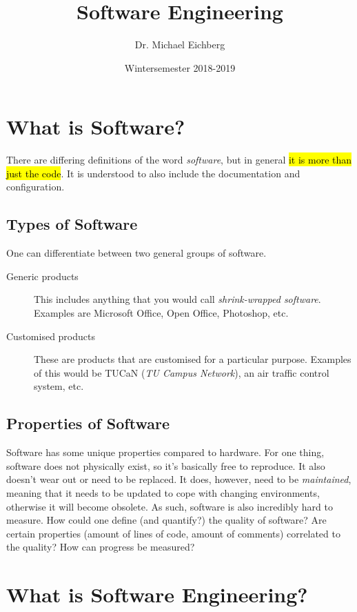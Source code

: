 \documentclass[english]{scrartcl}
\title{Software Engineering}
\date{Wintersemester 2018-2019}
\author{Dr. Michael Eichberg}
\begin{document}
\maketitle
\tableofcontents
\newpage

\section{What is Software?}

There are differing definitions of the word \emph{software}, but in general \hl{it is more than just the code}. It is understood to also include the documentation and configuration. 

\subsection{Types of Software}

One can differentiate between two general groups of software. 
\begin{description}
\item[Generic products] This includes anything that you would call \emph{shrink-wrapped software}. Examples are Microsoft Office, Open Office, Photoshop, etc.
\item[Customised products] These are products that are customised for a particular purpose. Examples of this would be TUCaN (\emph{TU Campus Network}), an air traffic control system, etc.
\end{description}

\subsection{Properties of Software}

Software has some unique properties compared to hardware. For one thing, software does not physically exist, so it's basically free to reproduce. It also doesn't wear out or need to be replaced. It does, however, need to be \emph{maintained}, meaning that it needs to be updated to cope with changing environments, otherwise it will become obsolete. As such, software is also incredibly hard to measure. How could one define (and quantify?) the quality of software? Are certain properties (amount of lines of code, amount of comments) correlated to the quality? How can progress be measured?



\section{What is Software Engineering?}
\end{document}
